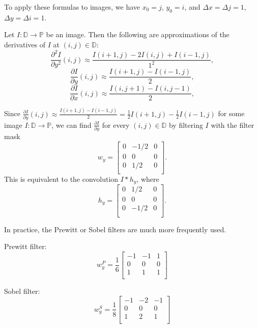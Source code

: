 \documentclass[12pt]{article}
\begin{document}
\begin{rmk}
    To apply these formulas to images, we have $x_0 = j$, $y_0 = i$, and $\Delta x = \Delta j = 1$, $\Delta y = \Delta i = 1$.
\end{rmk}

\begin{exmp}
    Let $I: \mathbb{D} \to \mathbb{P}$ be an image. Then the following are approximations of the derivatives of $I$ at $(i, j) \in \mathbb{D}$:
    \[\frac{\partial^2I}{\partial y^2}(i, j) \approx \frac{I(i + 1, j) - 2I(i, j) + I(i - 1, j)}{1^2},\]
    \[\frac{\partial I}{\partial y}(i, j) \approx \frac{I(i + 1, j) - I(i - 1, j)}{2},\]
    \[\frac{\partial I}{\partial x}(i, j) \approx \frac{I(i, j + 1) - I(i, j - 1)}{2},\]
\end{exmp}

Since $\frac{\partial I}{\partial y}(i, j) \approx \frac{I(i + 1, j) - I(i - 1, j)}{2} = \frac{1}{2}I(i + 1, j) - \frac{1}{2}I(i - 1, j)$ for some image $I: \mathbb{D} \to \mathbb{P}$, we can find $\frac{\partial I}{\partial y}$ for every $(i, j) \in \mathbb{D}$ by filtering $I$ with the filter mask \[w_y = \begin{bmatrix}
    0 & -1/2 & 0 \\
    0 & 0 & 0 \\
    0 & 1/2 & 0 \\
\end{bmatrix}.\] This is equivalent to the convolution $I * h_y$, where \[h_y = \begin{bmatrix}
    0 & 1/2 & 0 \\
    0 & 0 & 0 \\
    0 & -1/2 & 0 \\
\end{bmatrix}.\]

In practice, the Prewitt or Sobel filters are much more frequently used.

Prewitt filter: \[w_y^P = \frac{1}{6}\begin{bmatrix}
    -1 & -1 & 1 \\
    0 & 0 & 0 \\
    1 & 1 & 1 \\
\end{bmatrix}\]

Sobel filter: \[w_y^S = \frac{1}{8}\begin{bmatrix}
    -1 & -2 & -1 \\
    0 & 0 & 0 \\
    1 & 2 & 1 \\
\end{bmatrix}\]
\end{document}
